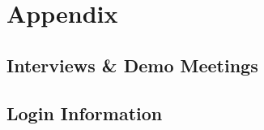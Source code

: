 \part*{Appendix}
\chapter{Interviews \& Demo Meetings}
\label{app:interview}











\chapter{Login Information}